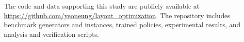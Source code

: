 The code and data supporting this study are publicly available at
\url{https://github.com/yeoneung/layout_optimization}.
The repository includes benchmark generators and instances, trained policies,
experimental results, and analysis and verification scripts.
